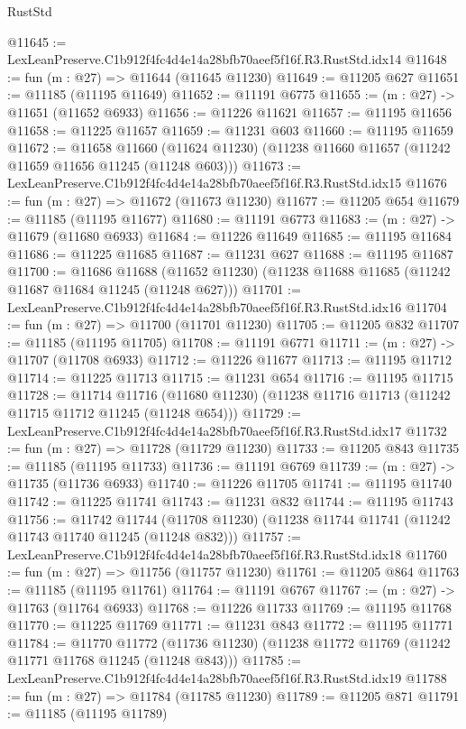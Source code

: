 \begin{lexlean}{RustStd}
\begin{coremodule}
@11645 := LexLeanPreserve.C1b912f4fc4d4e14a28bfb70aeef5f16f.R3.RustStd.idx14
@11648 := fun (m : @27) => @11644 (@11645 @11230)
@11649 := @11205 @627
@11651 := @11185 (@11195 @11649)
@11652 := @11191 @6775
@11655 := (m : @27) -> @11651 (@11652 @6933)
@11656 := @11226 @11621
@11657 := @11195 @11656
@11658 := @11225 @11657
@11659 := @11231 @603
@11660 := @11195 @11659
@11672 := @11658
    @11660
    (@11624 @11230)
    (@11238 @11660 @11657 (@11242 @11659 @11656 @11245 (@11248 @603)))
@11673 := LexLeanPreserve.C1b912f4fc4d4e14a28bfb70aeef5f16f.R3.RustStd.idx15
@11676 := fun (m : @27) => @11672 (@11673 @11230)
@11677 := @11205 @654
@11679 := @11185 (@11195 @11677)
@11680 := @11191 @6773
@11683 := (m : @27) -> @11679 (@11680 @6933)
@11684 := @11226 @11649
@11685 := @11195 @11684
@11686 := @11225 @11685
@11687 := @11231 @627
@11688 := @11195 @11687
@11700 := @11686
    @11688
    (@11652 @11230)
    (@11238 @11688 @11685 (@11242 @11687 @11684 @11245 (@11248 @627)))
@11701 := LexLeanPreserve.C1b912f4fc4d4e14a28bfb70aeef5f16f.R3.RustStd.idx16
@11704 := fun (m : @27) => @11700 (@11701 @11230)
@11705 := @11205 @832
@11707 := @11185 (@11195 @11705)
@11708 := @11191 @6771
@11711 := (m : @27) -> @11707 (@11708 @6933)
@11712 := @11226 @11677
@11713 := @11195 @11712
@11714 := @11225 @11713
@11715 := @11231 @654
@11716 := @11195 @11715
@11728 := @11714
    @11716
    (@11680 @11230)
    (@11238 @11716 @11713 (@11242 @11715 @11712 @11245 (@11248 @654)))
@11729 := LexLeanPreserve.C1b912f4fc4d4e14a28bfb70aeef5f16f.R3.RustStd.idx17
@11732 := fun (m : @27) => @11728 (@11729 @11230)
@11733 := @11205 @843
@11735 := @11185 (@11195 @11733)
@11736 := @11191 @6769
@11739 := (m : @27) -> @11735 (@11736 @6933)
@11740 := @11226 @11705
@11741 := @11195 @11740
@11742 := @11225 @11741
@11743 := @11231 @832
@11744 := @11195 @11743
@11756 := @11742
    @11744
    (@11708 @11230)
    (@11238 @11744 @11741 (@11242 @11743 @11740 @11245 (@11248 @832)))
@11757 := LexLeanPreserve.C1b912f4fc4d4e14a28bfb70aeef5f16f.R3.RustStd.idx18
@11760 := fun (m : @27) => @11756 (@11757 @11230)
@11761 := @11205 @864
@11763 := @11185 (@11195 @11761)
@11764 := @11191 @6767
@11767 := (m : @27) -> @11763 (@11764 @6933)
@11768 := @11226 @11733
@11769 := @11195 @11768
@11770 := @11225 @11769
@11771 := @11231 @843
@11772 := @11195 @11771
@11784 := @11770
    @11772
    (@11736 @11230)
    (@11238 @11772 @11769 (@11242 @11771 @11768 @11245 (@11248 @843)))
@11785 := LexLeanPreserve.C1b912f4fc4d4e14a28bfb70aeef5f16f.R3.RustStd.idx19
@11788 := fun (m : @27) => @11784 (@11785 @11230)
@11789 := @11205 @871
@11791 := @11185 (@11195 @11789)

\end{coremodule}
\end{lexlean}
